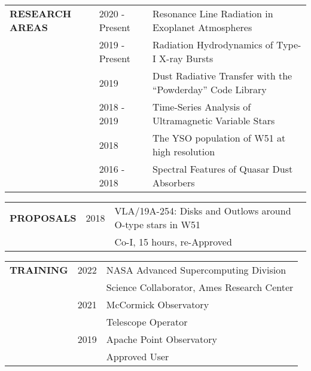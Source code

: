 \documentclass{article}
\begin{document}
\hspace{4.6cm}\begin{minipage}{\dimexpr\textwidth-5.2cm}

\xdef\tpd{\the\prevdepth}
\end{minipage}
\vspace{0.5cm}










\begin{tabular}{p{4cm}p{2.2cm}l}
    \large{\textbf{RESEARCH \newline AREAS}}
    &2020 - Present& Resonance Line Radiation in Exoplanet Atmospheres \vspace{-0.5cm}\\
    &2019 - Present& Radiation Hydrodynamics of Type-I X-ray Bursts\\
    &2019 & Dust Radiative Transfer with the ``Powderday'' Code Library\\
    &2018 - 2019 & Time-Series Analysis of Ultramagnetic Variable Stars\\
    &2018 & The YSO population of W51 at high resolution \\
    &2016 - 2018 & Spectral Features of Quasar Dust Absorbers \\
\end{tabular}
\vspace{0.5cm}








\begin{tabular}{p{4cm}p{2.2cm}l}
    \large{\textbf{PROPOSALS}} & 2018 & VLA/19A-254: Disks and Outlows around O-type stars in W51 \\
     & & \small Co-I, 15 hours, re-Approved \\
\end{tabular}
\vspace{0.5cm}








\begin{tabular}{p{4cm}p{2.2cm}l}
    \large{\textbf{TRAINING}} & 2022 & NASA Advanced Supercomputing Division\\ 
     & & \small Science Collaborator, Ames Research Center\vspace{0.25cm}\\
      & 2021 & McCormick Observatory\\ 
     & & \small Telescope Operator\vspace{0.25cm}\\
     & 2019 & Apache Point Observatory\\ 
     & & \small Approved User\\
\end{tabular}
\vspace{0.5cm}
\end{document}
